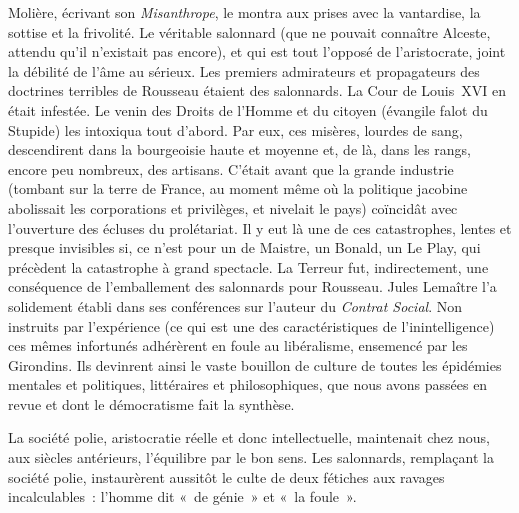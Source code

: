 \documentclass[french,twoside]{book} %
\begin{document}
Molière, écrivant son {\itshape Misanthrope}, le montra aux prises avec la vantardise, la sottise et la frivolité. Le véritable salonnard (que ne pouvait connaître Alceste, attendu qu’il n’existait pas encore), et qui est tout l’opposé de l’aristocrate, joint la débilité de l’âme au sérieux. Les premiers admirateurs et propagateurs des doctrines terribles de Rousseau étaient des salonnards. La Cour de Louis XVI en était infestée. Le venin des Droits de l’Homme et du citoyen (évangile falot du Stupide) les intoxiqua tout d’abord. Par eux, ces misères, lourdes de sang, descendirent dans la bourgeoisie haute et moyenne et, de là, dans les rangs, encore peu nombreux, des artisans. C’était avant que la grande industrie (tombant sur la terre de France, au moment même où la politique jacobine abolissait les corporations et privilèges, et nivelait le pays) coïncidât avec l’ouverture des écluses du prolétariat. Il y eut là une de ces catastrophes, lentes et presque invisibles si, ce n’est pour un de Maistre, un Bonald, un Le Play, qui précèdent la catastrophe à grand spectacle. La Terreur fut, indirectement, une conséquence de l’emballement des salonnards pour Rousseau. Jules Lemaître l’a solidement établi dans ses conférences sur l’auteur du {\itshape Contrat Social}. Non instruits par l’expérience (ce qui est une des caractéristiques de l’inintelligence) ces mêmes infortunés adhérèrent en foule au libéralisme, ensemencé par les Girondins. Ils devinrent ainsi le vaste bouillon de culture de toutes les épidémies mentales et politiques, littéraires et philosophiques, que nous avons passées en revue et dont le démocratisme fait la synthèse.\par
La société polie, aristocratie réelle et donc intellectuelle, maintenait chez nous, aux siècles antérieurs, l’équilibre par le bon sens. Les salonnards, remplaçant la société polie, instaurèrent aussitôt le culte de deux fétiches aux ravages incalculables : l’homme dit « de génie » et « la foule ».\par
\end{document}
